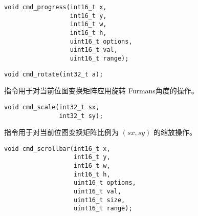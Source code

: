 

\begin{framed}
\begin{verbatim}
void cmd_progress(int16_t x,
                  int16_t y,
                  int16_t w,
                  int16_t h,
                  uint16_t options,
                  uint16_t val,
                  uint16_t range);
\end{verbatim}
\end{framed}



\begin{framed}
\begin{verbatim}
void cmd_rotate(int32_t a);
\end{verbatim}
\end{framed}

 指令用于对当前位图变换矩阵应用旋转  Furmans角度的操作。


\begin{framed}
\begin{verbatim}
void cmd_scale(int32_t sx,
               int32_t sy);
\end{verbatim}
\end{framed}

 指令用于对当前位图变换矩阵比例为 $(sx, sy)$ 的缩放操作。
\fsixteen


\begin{framed}
\begin{verbatim}
void cmd_scrollbar(int16_t x,
                   int16_t y,
                   int16_t w,
                   int16_t h,
                   uint16_t options,
                   uint16_t val,
                   uint16_t size,
                   uint16_t range);
\end{verbatim}
\end{framed}

